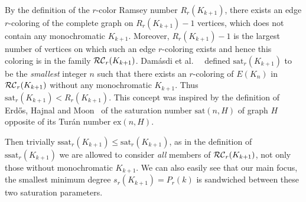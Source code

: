 \documentclass[12pt]{article}
\theoremstyle{definition}
\begin{document}
By the definition of the $r$-color Ramsey number $R_r(K_{k+1})$, there exists an edge $r$-coloring of the complete graph on $R_r(K_{k+1})-1$ vertices, which does not contain any monochromatic $K_{k+1}$. Moreover, $R_r(K_{k+1}) -1$ is the largest number of vertices on which such an edge $r$-coloring exists and hence this coloring is in the family ${\cal RC}_r(K_{k+1})$.  
	Dam\'asdi et al.\ ~\cite{damasdi2021saturation} defined $\mathrm{sat}_r(K_{k+1})$ to be the {\em smallest} integer $n$ such that there exists an $r$-coloring of $E(K_n)$ in ${\cal RC}_r(K_{k+1})$ without any monochromatic $K_{k+1}$. Thus $\mathrm{sat}_r(K_{k+1}) < R_r(K_{k+1})$. 
	This concept was inspired by the definition of Erd\H os, Hajnal and Moon~\cite{erdos1964problem} of the saturation number $\mathrm{sat}(n,H)$ of graph $H$ opposite of its Tur\'an number $\mathrm{ex}(n,H)$. 
 
 Then trivially $\mathrm{ssat}_r(K_{k+1}) \leq \mathrm{sat}_r(K_{k+1})$, as in the definition of $\mathrm{ssat}_r(K_{k+1})$ we are allowed to consider {\em all} members of ${\cal RC}_r(K_{k+1})$, not only those without monochromatic $K_{k+1}$. We can also easily see that our main focus, the smallest minimum degree $s_r(K_{k+1}) = P_r(k)$ is sandwiched between these two saturation parameters. 
	
\end{document}
